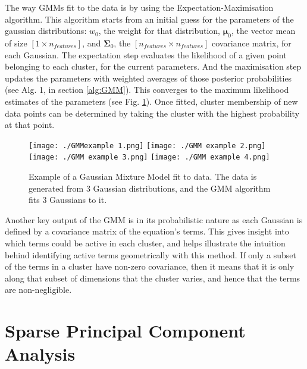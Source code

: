 \documentclass[12pt]{report} %
\begin{document}
\vspace{5mm}

The way GMMs fit to the data is by using the Expectation-Maximisation algorithm. This algorithm starts from an initial guess for the parameters of the gaussian distributions: $w_0$, the weight for that distribution, $\mathbf{\mu}_{0}$, the vector mean of size $[1 \times n_{features}]$, and $\mathbf{\Sigma}_{0}$, the $[n_{features} \times n_{features}]$ covariance matrix, for each Gaussian. The expectation step evaluates the likelihood of a given point belonging to each cluster, for the current parameters. And the maximisation step updates the parameters with weighted averages of those posterior probabilities\cite{dempster1977maximum} (see Alg. 1, in section \ref{alg:GMM}). This converges to the maximum likelihood estimates of the parameters (see Fig. \ref{fig:GMM_example}). Once fitted, cluster membership of new data points can be determined by taking the cluster with the highest probability at that point.

\begin{figure}[htbp]
  \centering
  \texttt{[image: ./GMMexample 1.png]}
  \texttt{[image: ./GMM example 2.png]}
  \texttt{[image: ./GMM example 3.png]}
  \texttt{[image: ./GMM example 4.png]}
  \caption{Example of a Gaussian Mixture Model fit to data. The data is generated from 3 Gaussian distributions, and the GMM algorithm fits 3 Gaussians to it. \cite[1D Example Notebook]{gmm_towardsdatascience}}
  \label{fig:GMM_example}
\end{figure}

Another key output of the GMM is in its probabilistic nature as each Gaussian is defined by a covariance matrix of the equation's terms. This gives insight into which terms could be active in each cluster, and helps illustrate the intuition behind identifying active terms geometrically with this method. If only a subset of the terms in a cluster have non-zero covariance, then it means that it is only along that subset of dimensions that the cluster varies, and hence that the terms are non-negligible.

\section{Sparse Principal Component Analysis}
\end{document}
